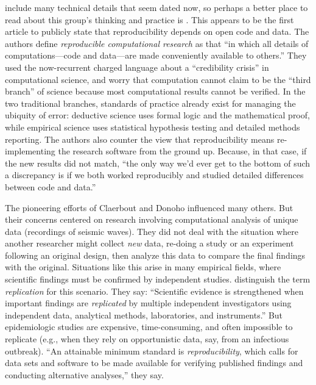 \documentclass{statement}
\newlength{\up}
\begin{document}
\cite{buckheit_donoho1995} include many technical details that seem dated now, so perhaps a better place to read about this group's thinking and practice is \cite{donohoETal2009}. 
This appears to be the first article to publicly state that reproducibility depends on open code and data. The authors define \emph{reproducible computational research} as that ``in which all details of computations---code and data---are made conveniently available to others.'' 
They used the now-recurrent charged language about a ``credibility crisis'' in computational science, and worry that computation cannot claim to be the ``third branch'' of science because most computational results cannot be verified. 
In the two traditional branches, standards of practice already exist for managing the ubiquity of error: deductive science uses formal logic and the mathematical proof, while empirical science uses statistical hypothesis testing and detailed methods reporting. 
The authors also counter the view that reproducibility means re-implementing the research software from the ground up. 
Because, in that case, if the new results did not match, ``the only way we'd ever get to the bottom of such a discrepancy is if we both worked reproducibly and studied detailed differences between code and data.''

The pioneering efforts of Claerbout and Donoho influenced many others. But their concerns centered on research involving computational analysis of unique data (recordings of seismic waves). 
They did not deal with the situation where another researcher might collect \emph{new} data, re-doing a study or an experiment following an original design, then analyze this data to compare the final findings with the original. 
Situations like this arise in many empirical fields, where scientific findings must be confirmed by independent studies. 
\cite{pengETal2006} distinguish the term \emph{replication} for this scenario. They say:
``Scientific evidence is strengthened when important findings are \emph{replicated} by multiple independent investigators using independent data, analytical methods, laboratories, and instruments.'' 
But epidemiologic studies are expensive, time-consuming, and often impossible to replicate (e.g., when they rely on opportunistic data, say, from an infectious outbreak). 
``An attainable minimum standard is \emph{reproducibility}, which calls for data sets and software to be made available for verifying published findings and conducting alternative analyses,'' they say.
\end{document}
